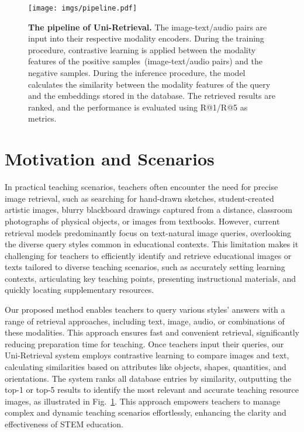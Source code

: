\begin{figure}[!tbp]
  \centering
   \texttt{[image: imgs/pipeline.pdf]}
   \vspace{-5mm}
   \caption{\textbf{The pipeline of Uni-Retrieval.} The image-text/audio pairs are input into their respective modality encoders. During the training procedure, contrastive learning is applied between the modality features of the positive samples~(image-text/audio pairs) and the negative samples. During the inference procedure, the model calculates the similarity between the modality features of the query and the embeddings stored in the database. The retrieved results are ranked, and the performance is evaluated using R@1/R@5 as metrics.}
   \label{fig:pipeline}
   \vspace{-5mm}
\end{figure}

\section{Motivation and Scenarios}
In practical teaching scenarios, teachers often encounter the need for precise image retrieval, such as searching for hand-drawn sketches, student-created artistic images, blurry blackboard drawings captured from a distance, classroom photographs of physical objects, or images from textbooks. However, current retrieval models predominantly focus on text-natural image queries, overlooking the diverse query styles common in educational contexts. This limitation makes it challenging for teachers to efficiently identify and retrieve educational images or texts tailored to diverse teaching scenarios, such as accurately setting learning contexts, articulating key teaching points, presenting instructional materials, and quickly locating supplementary resources.

Our proposed method enables teachers to query various styles' answers with a range of retrieval approaches, including text, image, audio, or combinations of these modalities. This approach ensures fast and convenient retrieval, significantly reducing preparation time for teaching. Once teachers input their queries, our Uni-Retrieval system employs contrastive learning to compare images and text, calculating similarities based on attributes like objects, shapes, quantities, and orientations. The system ranks all database entries by similarity, outputting the top-1 or top-5 results to identify the most relevant and accurate teaching resource images, as illustrated in Fig.~\ref{fig:pipeline}. This approach empowers teachers to manage complex and dynamic teaching scenarios effortlessly, enhancing the clarity and effectiveness of STEM education.



